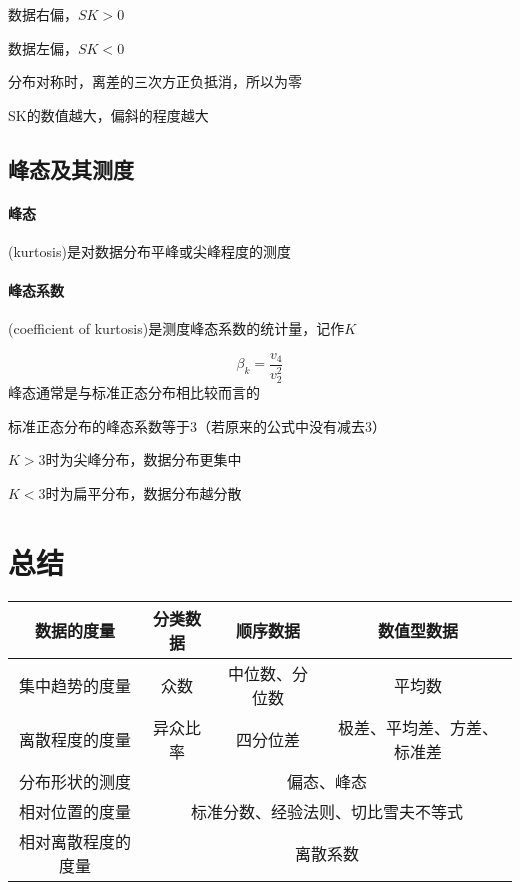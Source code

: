 \documentclass[UTF8,10pt]{book}
\begin{document}
                    {\kaishu 数据右偏，$SK > 0 $ }

                    {\kaishu 数据左偏，$SK < 0 $ }
                          
                    {\kaishu 分布对称时，离差的三次方正负抵消，所以为零}

                    {\kaishu SK的数值越大，偏斜的程度越大}


        \subsection{峰态及其测度}
                \paragraph{峰态} (kurtosis)是对数据分布平峰或尖峰程度的测度

                \paragraph{峰态系数} (coefficient of kurtosis)是测度峰态系数的统计量，记作$K$
                
                $$ \beta_k = \frac{v_4}{v_2^2} $$
                {\kaishu 峰态通常是与标准正态分布相比较而言的}

                {\kaishu 标准正态分布的峰态系数等于3（若原来的公式中没有减去3）}

                {\kaishu $K>3$时为尖峰分布，数据分布更集中}

                {\kaishu $K<3$时为扁平分布，数据分布越分散}

    \section{总结}
    
    	\begin{tabular}{|c|c|c|c|}%
    		\hline  %
    		 数据的度量&分类数据&顺序数据&数值型数据 \\
    		\hline  %
    		集中趋势的度量&众数& 中位数、分位数&平均数 \\
    		\hline %
    		离散程度的度量& 异众比率&四分位差&极差、平均差、方差、标准差 \\
    		\hline
    		分布形状的测度& \multicolumn{3}{|c|}{偏态、峰态} \\
    		\hline
    		\hline
    		\hline
    		相对位置的度量 & \multicolumn{3}{|c|}{标准分数、经验法则、切比雪夫不等式} \\
    		
    		相对离散程度的度量 & \multicolumn{3}{|c|}{离散系数} \\
    		\hline
    	\end{tabular}
\end{document}

